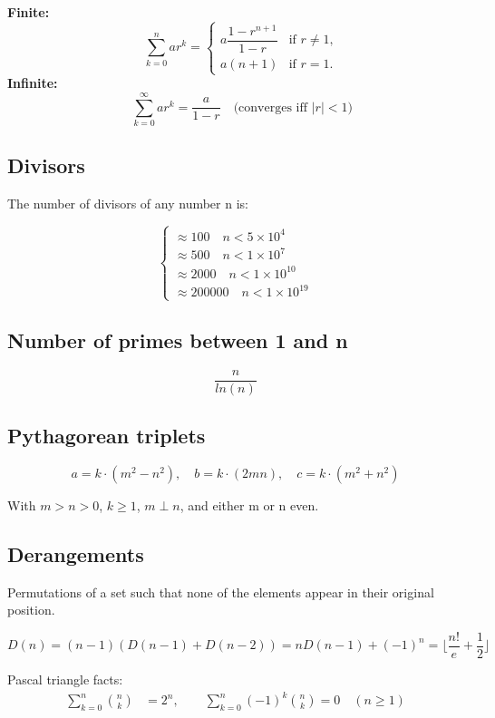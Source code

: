 \documentclass[10pt,letterpaper,landscape,twocolumn]{article}
\begin{document}
\textbf{Finite:} \[\quad \sum_{k=0}^{n} ar^k = 
\begin{cases} 
a \dfrac{1 - r^{n+1}}{1 - r} & \text{if } r \neq 1, \\
a(n + 1) & \text{if } r = 1.
\end{cases}
\]
\textbf{Infinite:} \[\quad \sum_{k=0}^{\infty} ar^k = \frac{a}{1 - r} \quad \text{(converges iff } |r| < 1\text{)}
\]
\subsection{Divisors}

The number of divisors of any number n is:

\[
\begin{cases}
    \approx 100 \quad n< 5 \times 10^4 \\
    \approx 500 \quad n<1 \times 10^7 \\
    \approx 2000 \quad n < 1 \times 10^10 \\
    \approx 200000 \quad n < 1 \times 10^19
\end{cases}
\]

\subsection{Number of primes between 1 and n}

\[
\frac{n}{ln(n)}
\]


\subsection{Pythagorean triplets}

\[
a = k \cdot (m^2 - n^2), \quad b = k\cdot(2mn), \quad c = k\cdot(m^2+n^2)
\]

With $m>n>0$, $k \geq 1$, $m\perp n$, and either m or n even.


\subsection{Derangements}

Permutations of a set such that none of the elements appear in their original position.

\[
D(n) = (n-1)(D(n-1)+D(n-2)) = nD(n-1)+(-1)^n = \lfloor \frac{n!}{e} + \frac{1}{2} \rfloor
\]

Pascal triangle facts:
\begin{align*}
\sum_{k=0}^{n}\binom{n}{k} &= 2^n, \qquad
\sum_{k=0}^{n}(-1)^k\binom{n}{k} = 0 \quad (n \geq 1)
\end{align*}
\end{document}
